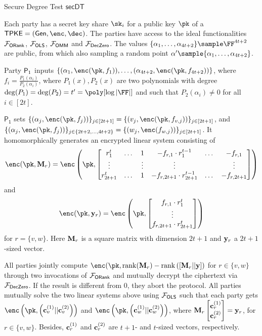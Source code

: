 \begin{algorithm}
\caption{Secure Degree Test $\mathsf{secDT}$}
\label{pro:secDT}
\begin{algorithmic}[1]
\REQUIRE Each party has a secret key share $\sk_i$ for a public key $\pk$ of a $\mathsf{TPKE}=(\mathsf{Gen},\enc,\dec)$. The parties have access to the  ideal functionalities $\mathcal{F}_\mathsf{ORank}$, $\mathcal{F}_\mathsf{OLS}$, $\mathcal{F}_\mathsf{OMM}$ and $\mathcal{F}_\mathsf{DecZero}$. The values $\{\alpha_1,\dots,\alpha_{4t+2}\}\sample\FF^{4t+2}$ are public, from which also sampling a random point $\alpha'\sample \{\alpha_1,\dots,\alpha_{4t+2}\}$.

\ENSURE Party $\mathsf{P}_1$ inputs $\{(\alpha_1,\enc(\pk,f_1)),\dots,(\alpha_{4t+2},\enc(\pk,f_{4t+2}))\}$, where $f_{i}=\frac{P_1(\alpha_i)}{P_2(\alpha_i)}$, where $P_1(x),P_2(x)$ are two polynomials with degree $\deg(P_1)=\deg(P_2)=t'=\poly[\log|\FF|]$ and such that $P_2(\alpha_i)\neq 0$  for all $i\in [2t]$.

\STATE $\mathsf{P_1}$ sets $\{(\alpha_j,\enc(\pk,f_j))\}_{j\in [2t+1]}=\{(v_j,\enc(\pk,f_{v,j}))\}_{j\in[2t+1]}$, and $\{(\alpha_j,\enc(\pk,f_j))\}_{j\in \{2t+2,\dots ,4t+2\}}=\{(w_j,\enc(f_{w,j}))\}_{j\in[2t+1]}$. It homomorphically generates an encrypted linear system consisting of
      $$\enc(\pk,\Mn_r)=\enc\left(\pk,\begin{bmatrix}
        r_1^{t}&\dots&1&-f_{r,1}\cdot r_1^{t-1}&\dots&-f_{r,1}\\
        \vdots&&\vdots&\vdots&&\vdots\\
        r_{2t+1}^{t}&\dots&1&-f_{r,2t+1}\cdot r_{2t+1}^{t-1}&\dots&-f_{r,2t+1}\\
      \end{bmatrix}\right)$$ and
      $$\enc(\pk,\yn_r)=\enc\left(\pk,\begin{bmatrix}
        f_{r,1}\cdot r_1^t\\
        \vdots\\
        f_{r,2t+1}\cdot r_{2t+1}^t
      \end{bmatrix}\right)$$ for  $r=\{v,w\}$.\footnotemark
      Here $\mathbf{M}_r$ is a square matrix with dimension $2t+1$ and $\mathbf{y}_r$ a $2t+1$-sized vector.

\STATE All parties jointly compute  $\enc(\pk,\rank(\Mn_r)-\rank\left(\left[\Mn_r||\yn\right]\right)$ for $ r\in\{v,w\}$ through two invocations of $\mathcal{F}_\mathsf{ORank}$ and mutually decrypt the ciphertext via $\mathcal{F}_\mathsf{DecZero}$. If the result is different from $0$, they abort the protocol.
\STATE All parties mutually solve the two linear systems above using $\mathcal{F}_\mathsf{OLS}$ such that each party gets $\enc\left(\pk,\left(\cn_{v}^{(1)}||\cn_{v}^{(2)}\right)\right)$ and $\enc\left(\pk,\left(\cn_{w}^{(1)}||\cn_{w}^{(2)}\right)\right)$, where $\mathbf{M}_r\begin{bmatrix}\mathbf{c}_{r}^{(1)}\\\mathbf{c}_{r}^{(2)}\end{bmatrix}=\mathbf{y}_r$, for $r\in\{v,w\}$. Besides, $\mathbf{c}_r^{(1)}$ and $\mathbf{c}_r^{(2)}$ are $t+1$- and $t$-sized vectors, respectively.


\end{algorithmic}
\end{algorithm}
